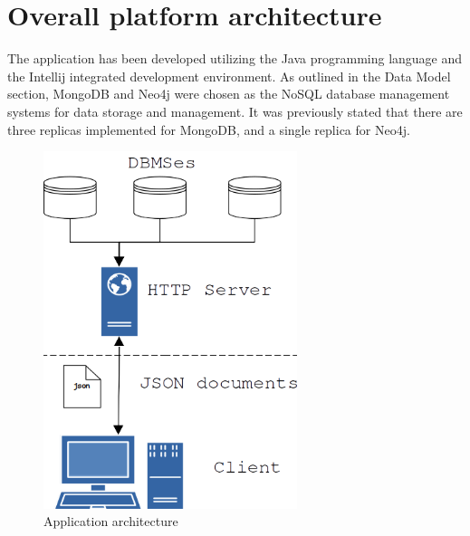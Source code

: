\chapter{Overall platform architecture}

The application has been developed utilizing the Java programming language and 
the Intellij integrated development environment. As outlined in the Data Model 
section, MongoDB and Neo4j were chosen as the NoSQL database management systems 
for data storage and management. It was previously stated that there are three 
replicas implemented for MongoDB, and a single replica for Neo4j.

\begin{figure}[H]
	\centering
	\includegraphics[width=0.66\textwidth]{assets/diagram0.png}
	\caption{Application architecture}
	\label{fig:diagram0}
\end{figure}


